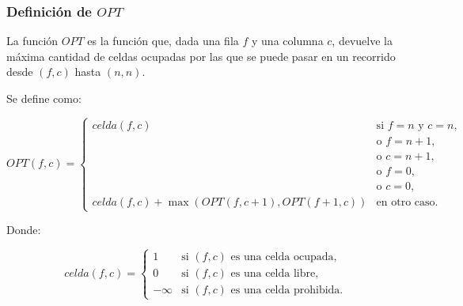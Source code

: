 \subsubsection{Definición de $OPT$}

La función $OPT$ es la función que, dada una fila $f$ y una columna $c$, devuelve la máxima cantidad de celdas ocupadas por las que se puede pasar en un recorrido desde \( (f, c) \) hasta \( (n, n) \).

Se define como:

\[
	OPT(f, c) =
	\begin{cases}
		celda(f, c)                                             & \text{si } f = n \text{ y } c = n, \\
		                                                        & \text{o } f = n+1,                 \\
		                                                        & \text{o } c = n+1,                 \\
		                                                        & \text{o } f = 0,                   \\
		                                                        & \text{o } c = 0,                   \\
		celda(f, c) + \max\left(OPT(f, c+1), OPT(f+1, c)\right) & \text{en otro caso}.
	\end{cases}
\]

Donde:

\[
	celda(f,c) =
	\begin{cases}
		1       & \text{si } (f,c) \text{ es una celda ocupada,}   \\
		0       & \text{si } (f,c) \text{ es una celda libre,}     \\
		-\infty & \text{si } (f,c) \text{ es una celda prohibida.}
	\end{cases}
\]

